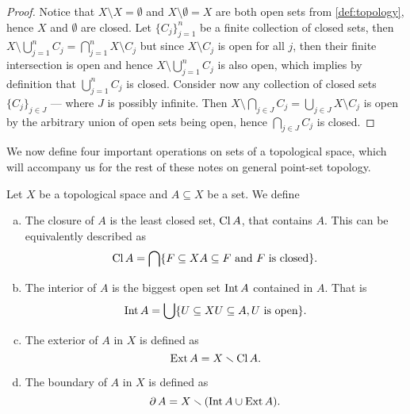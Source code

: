 \begin{proof}
    Notice that \(X \setminus X = \emptyset\) and \(X \setminus \emptyset = X\) are
    both open sets from \cref{def:topology}, hence \(X\) and \(\emptyset\) are
    closed. Let \(\{C_{j}\}_{j=1}^n\) be a finite collection of closed sets, then
    \(X \setminus \bigcup_{j=1}^n C_j = \bigcap_{j=1}^n X \setminus C_j\) but since
    \(X \setminus C_j\) is open for all \(j\), then their finite intersection is
    open and hence \(X \setminus \bigcup_{j=1}^n C_j\) is also open, which implies
    by definition that \(\bigcup_{j=1}^n C_j\) is closed. Consider now any
    collection of closed sets \(\{C_{j}\}_{j \in J}\) --- where \(J\) is possibly
    infinite. Then \(X \setminus \bigcap_{j \in J} C_j = \bigcup_{j \in J} X
    \setminus C_j\) is open by the arbitrary union of open sets being open, hence
    \(\bigcap_{j \in J} C_j\) is closed.
\end{proof}

We now define four important operations on sets of a topological space, which
will accompany us for the rest of these notes on general point-set topology.

\begin{definition}
    Let \(X\) be a topological space and \(A \subseteq X\) be a set. We define
    \begin{enumerate}[(a)]\setlength\itemsep{0em}
        \item\label{def: closure}
        The closure of \(A\) is the least closed set, \(\operatorname{Cl} A\), that
        contains \(A\). This can be equivalently described as
        \[
            \operatorname{Cl} A = \bigcap \{F \subseteq X \relax A \subseteq F \text{ and } F
            \text{ is closed}\}.
        \]

        \item\label{def: interior}
        The interior of \(A\) is the biggest open set \(\operatorname{Int} A\) contained in
        \(A\). That is
        \[
            \operatorname{Int} A = \bigcup \{U \subseteq X \relax U \subseteq A, U \text{ is open}\}.
        \]

        \item\label{def: exterior}
        The exterior of \(A\) in \(X\) is defined as
        \[
            \operatorname{Ext} A = X \smallsetminus \operatorname{Cl} A.
        \]

        \item\label{def: boundary}
        The boundary of \(A\) in \(X\) is defined as
        \[
            \operatorname{\partial} A = X \smallsetminus (\operatorname{Int} A \cup \operatorname{Ext} A).
        \]
    \end{enumerate}
\end{definition}


